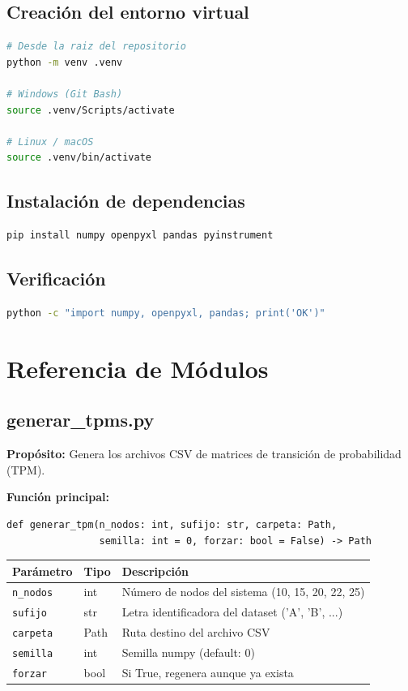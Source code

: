 \documentclass[12pt,a4paper]{article}
\begin{document}
\subsection{Creación del entorno virtual}
\begin{lstlisting}[language=bash]
# Desde la raiz del repositorio
python -m venv .venv

# Windows (Git Bash)
source .venv/Scripts/activate

# Linux / macOS
source .venv/bin/activate
\end{lstlisting}

\subsection{Instalación de dependencias}
\begin{lstlisting}[language=bash]
pip install numpy openpyxl pandas pyinstrument
\end{lstlisting}

\subsection{Verificación}
\begin{lstlisting}[language=bash]
python -c "import numpy, openpyxl, pandas; print('OK')"
\end{lstlisting}

\section{Referencia de Módulos}

\subsection{generar\_tpms.py}

\textbf{Propósito:} Genera los archivos CSV de matrices de transición de probabilidad (TPM).

\textbf{Función principal:}
\begin{lstlisting}
def generar_tpm(n_nodos: int, sufijo: str, carpeta: Path,
                semilla: int = 0, forzar: bool = False) -> Path
\end{lstlisting}

\begin{longtable}{lll}
    \toprule
    Parámetro & Tipo & Descripción \\
    \midrule
    \endhead
    \texttt{n\_nodos} & int & Número de nodos del sistema (10, 15, 20, 22, 25) \\
    \texttt{sufijo}  & str & Letra identificadora del dataset ('A', 'B', ...) \\
    \texttt{carpeta} & Path & Ruta destino del archivo CSV \\
    \texttt{semilla} & int & Semilla numpy (default: 0) \\
    \texttt{forzar}  & bool & Si True, regenera aunque ya exista \\
    \bottomrule
\end{longtable}
\end{document}
